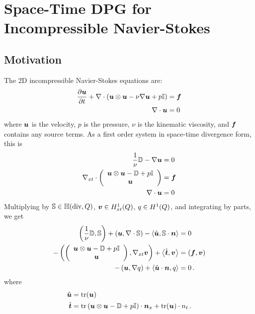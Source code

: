 \documentclass[Dissertation.tex]{subbIles}
\begin{document}
\chapter{Space-Time DPG for Incompressible Navier-Stokes}
\section{Motivation}
The 2D incompressible Navier-Stokes equations are:
\begin{align*}
  \pd{\bfu}{t}+\Div\LRp{\bfu\otimes\bfu-\nu\Grad\bfu+p\bbI}&=\bff\\
  \Div\bfu&=0
\end{align*}
where $\bfu$ is the velocity, $p$ is the pressure, $\nu$ is the kinematic viscosity,
and $\bff$ contains any source terms.
As a first order system in space-time divergence form, this is
\begin{align*}
  \frac{1}{\nu}\bbD-\Grad\bfu&=0\\
  \Divxt\vecttwo{\bfu\otimes\bfu-\bbD+p\bbI}{\bfu}&=\bff\\
  \Div\bfu&=0
\end{align*}
Multiplying by $\bbS\in\bbH(\text{div},Q)$, $\bfv\in\HonextQ$, $q\in\HonexQ$, and integrating by
parts, we get
\begin{align*}
  \LRp{\frac{1}{\nu}\bbD,\bbS}
  +\LRp{\bfu,\Div\bbS}
  -\LRa{\hat\bfu,\bbS\cdot\bfn}&=0\\
  -\LRp{\vecttwo{\bfu\otimes\bfu-\bbD+p\bbI}{\bfu},\Gradxt\bfv}
  +\LRa{\hat\bft,\bfv}
  &=(\bff,\bfv)\\
  -\LRp{\bfu,\Grad q}
  +\LRa{\hat{\bfu}\cdot\bfn,q}&=0\,.
\end{align*}
where
\begin{align*}
\hat\bfu&=\trace(\bfu)\\
\hat\bft&=\trace\LRp{\bfu\otimes\bfu-\bbD+p\bbI}\cdot\bfn_x
+\trace(\bfu)\cdot n_t\,.
\end{align*}
\end{document}
